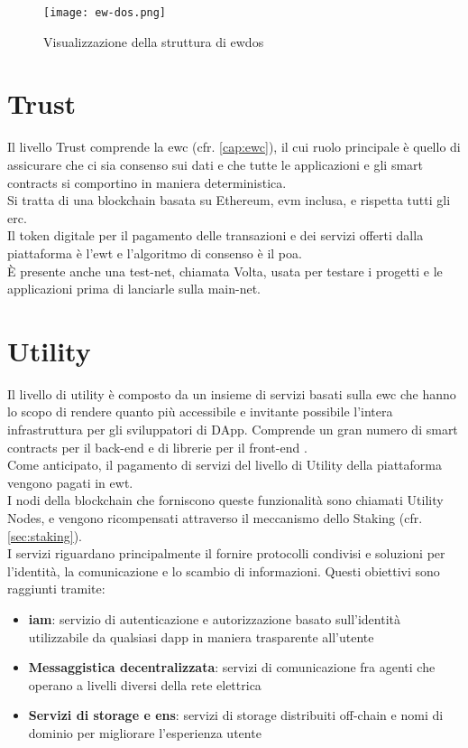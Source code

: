 \begin{figure}[h]
    \texttt{[image: ew-dos.png]}
    \centering
    \caption{Visualizzazione della struttura di \gls{ewdos} \cite{img:ew-dos}}
    \label{lab:ew-dos}
\end{figure}

\section{Trust}
Il livello Trust comprende la \gls{ewc} (cfr. \autoref{cap:ewc}),
il cui ruolo principale è quello di assicurare che ci sia consenso sui dati e che tutte le applicazioni e gli smart contracts si comportino in maniera deterministica. \\
Si tratta di una blockchain basata su Ethereum, \gls{evm} inclusa, e rispetta tutti gli \gls{erc}. \\
Il token digitale per il pagamento delle transazioni e dei servizi offerti dalla piattaforma è l'\gls{ewt} e l'algoritmo di consenso è il \gls{poa}. \\
È presente anche una test-net, chiamata Volta, usata per testare i progetti e le applicazioni prima di lanciarle sulla main-net.

\section{Utility}
Il livello di utility è composto da un insieme di servizi basati sulla \gls{ewc} che hanno lo scopo di rendere quanto più accessibile e invitante possibile l'intera infrastruttura per gli sviluppatori di DApp.
Comprende un gran numero di smart contracts per il back-end e di librerie per il front-end \cite{art:ew-dos}. \\
Come anticipato, il pagamento di servizi del livello di Utility della piattaforma vengono pagati in \gls{ewt}. \\
I nodi della blockchain che forniscono queste funzionalità sono chiamati Utility Nodes, e vengono ricompensati attraverso il meccanismo dello Staking (cfr. \autoref{sec:staking}).\\

I servizi riguardano principalmente il fornire protocolli condivisi e soluzioni per l'identità, la comunicazione e lo scambio di informazioni.
Questi obiettivi sono raggiunti tramite:
\begin{itemize}
    \item \textbf{\gls{iam}}: servizio di autenticazione e autorizzazione basato sull'identità utilizzabile da qualsiasi \gls{dapp} in maniera trasparente all'utente
    \item \textbf{Messaggistica decentralizzata}: servizi di comunicazione fra agenti che operano a livelli diversi della rete elettrica
    \item \textbf{Servizi di storage e \gls{ens}}: servizi di storage distribuiti off-chain e nomi di dominio per migliorare l'esperienza utente
\end{itemize}

